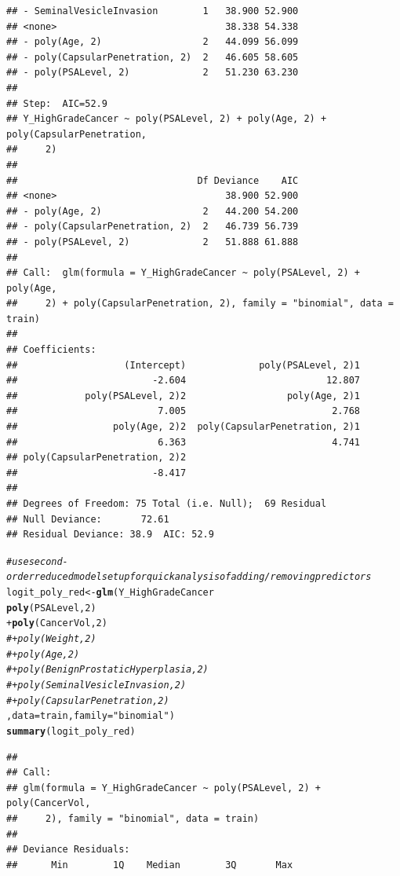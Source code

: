 \documentclass{article}\usepackage[]{graphicx}\usepackage[]{color}
\makeatletter
\newcommand{\hlnum}[1]{\textcolor[rgb]{0.686,0.059,0.569}{#1}}%
\newcommand{\hlstr}[1]{\textcolor[rgb]{0.192,0.494,0.8}{#1}}%
\newcommand{\hlcom}[1]{\textcolor[rgb]{0.678,0.584,0.686}{\textit{#1}}}%
\newcommand{\hlopt}[1]{\textcolor[rgb]{0,0,0}{#1}}%
\newcommand{\hlstd}[1]{\textcolor[rgb]{0.345,0.345,0.345}{#1}}%
\newcommand{\hlkwb}[1]{\textcolor[rgb]{0.69,0.353,0.396}{#1}}%
\newcommand{\hlkwc}[1]{\textcolor[rgb]{0.333,0.667,0.333}{#1}}%
\newcommand{\hlkwd}[1]{\textcolor[rgb]{0.737,0.353,0.396}{\textbf{#1}}}%
\newenvironment{kframe}{%
 \def\at@end@of@kframe{}%
 \ifinner\ifhmode%
  \def\at@end@of@kframe{\end{minipage}}%
  \begin{minipage}{\columnwidth}%
 \fi\fi%
 \def\FrameCommand##1{\hskip\@totalleftmargin \hskip-\fboxsep
 \colorbox{shadecolor}{##1}\hskip-\fboxsep
     \hskip-\linewidth \hskip-\@totalleftmargin \hskip\columnwidth}%
 \MakeFramed {\advance\hsize-\width
   \@totalleftmargin\z@ \linewidth\hsize
   \@setminipage}}%
 {\par\unskip\endMakeFramed%
 \at@end@of@kframe}
\newenvironment{knitrout}{}{} %
\makeatother
\begin{document}
\begin{knitrout}
\begin{kframe}
\begin{verbatim}
## - SeminalVesicleInvasion        1   38.900 52.900
## <none>                              38.338 54.338
## - poly(Age, 2)                  2   44.099 56.099
## - poly(CapsularPenetration, 2)  2   46.605 58.605
## - poly(PSALevel, 2)             2   51.230 63.230
## 
## Step:  AIC=52.9
## Y_HighGradeCancer ~ poly(PSALevel, 2) + poly(Age, 2) + poly(CapsularPenetration, 
##     2)
## 
##                                Df Deviance    AIC
## <none>                              38.900 52.900
## - poly(Age, 2)                  2   44.200 54.200
## - poly(CapsularPenetration, 2)  2   46.739 56.739
## - poly(PSALevel, 2)             2   51.888 61.888
## 
## Call:  glm(formula = Y_HighGradeCancer ~ poly(PSALevel, 2) + poly(Age, 
##     2) + poly(CapsularPenetration, 2), family = "binomial", data = train)
## 
## Coefficients:
##                   (Intercept)             poly(PSALevel, 2)1  
##                        -2.604                         12.807  
##            poly(PSALevel, 2)2                  poly(Age, 2)1  
##                         7.005                          2.768  
##                 poly(Age, 2)2  poly(CapsularPenetration, 2)1  
##                         6.363                          4.741  
## poly(CapsularPenetration, 2)2  
##                        -8.417  
## 
## Degrees of Freedom: 75 Total (i.e. Null);  69 Residual
## Null Deviance:	    72.61 
## Residual Deviance: 38.9 	AIC: 52.9
\end{verbatim}
\begin{alltt}
\hlcom{# use second-order reduced model setup for quick analysis of adding/removing predictors}
\hlstd{logit_poly_red} \hlkwb{<-} \hlkwd{glm}\hlstd{(Y_HighGradeCancer} \hlopt{~}
                        \hlkwd{poly}\hlstd{(PSALevel,} \hlnum{2}\hlstd{)}
                      \hlopt{+} \hlkwd{poly}\hlstd{(CancerVol,} \hlnum{2}\hlstd{)}
                      \hlcom{# + poly(Weight, 2) }
                      \hlcom{# + poly(Age, 2)}
                      \hlcom{# + poly(BenignProstaticHyperplasia, 2)}
                      \hlcom{# + poly(SeminalVesicleInvasion, 2) }
                      \hlcom{#  + poly(CapsularPenetration, 2)}
                      \hlstd{,} \hlkwc{data}\hlstd{=train,} \hlkwc{family}\hlstd{=}\hlstr{"binomial"}\hlstd{)}
\hlkwd{summary}\hlstd{(logit_poly_red)}
\end{alltt}
\begin{verbatim}
## 
## Call:
## glm(formula = Y_HighGradeCancer ~ poly(PSALevel, 2) + poly(CancerVol, 
##     2), family = "binomial", data = train)
## 
## Deviance Residuals: 
##      Min        1Q    Median        3Q       Max  

\end{verbatim}
\end{kframe}
\end{knitrout}
\end{document}
